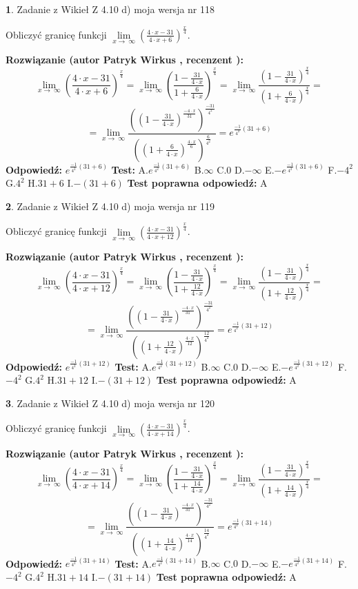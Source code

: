 \documentclass[12pt, a4paper]{article}
\theoremstyle{definition} %
\newtheorem{zad}{}
\newcommand{\zadStart}[1]{\begin{zad}#1\newline}
\newcommand{\zadStop}{\end{zad}}
\newcommand{\rozwStart}[2]{\noindent \textbf{Rozwiązanie (autor #1 , recenzent #2): }\newline}
\newcommand{\rozwStop}{\newline}
\newcommand{\odpStart}{\noindent \textbf{Odpowiedź:}\newline}
\newcommand{\odpStop}{\newline}
\newcommand{\testStart}{\noindent \textbf{Test:}\newline}
\newcommand{\testStop}{\newline}
\newcommand{\kluczStart}{\noindent \textbf{Test poprawna odpowiedź:}\newline}
\newcommand{\kluczStop}{\newline}
\begin{document}
\zadStart{Zadanie z Wikieł Z 4.10 d) moja wersja nr 118}


Obliczyć granicę funkcji  $\lim\limits_{x\to\ \infty}(\frac{4\cdot x-31}{4\cdot x+6})^{\frac{x}{4}}$.
\zadStop
\rozwStart{Patryk Wirkus}{}
$$\lim\limits_{x\to\ \infty}(\frac{4\cdot x-31}{4\cdot x+6})^{\frac{x}{4}} = \lim\limits_{x\to\ \infty}(\frac{1-\frac{31}{4\cdot x}}{1+\frac{6}{4\cdot x}})^{\frac{x}{4}}=\lim\limits_{x\to\ \infty}\frac{(1-\frac{31}{4\cdot x})^{\frac{x}{4}}}{(1+\frac{6}{4\cdot x})^{\frac{x}{4}}}=$$
$$=\lim\limits_{x\to\ \infty}\frac{((1-\frac{31}{4\cdot x})^{\frac{-4\cdot x}{31}})^{\frac{-31}{4^{2}}}}{((1+\frac{6}{4\cdot x})^{\frac{4\cdot x}{6}})^{\frac{6}{4^{2}}}}=e^{\frac{-1}{4^{2}}(31+6)}$$
\rozwStop
\odpStart
$e^{\frac{-1}{4^{2}}(31+6)}$
\odpStop
\testStart
A.$e^{\frac{-1}{4^{2}}(31+6)}$ B.$\infty$ C.$0$ D.$-\infty$ E.$-e^{\frac{-1}{4^{2}}(31+6)}$
F.$-4^{2}$ G.$4^{2}$
H.$31+6$
I.$-(31+6)$
\testStop
\kluczStart
A
\kluczStop



\zadStart{Zadanie z Wikieł Z 4.10 d) moja wersja nr 119}


Obliczyć granicę funkcji  $\lim\limits_{x\to\ \infty}(\frac{4\cdot x-31}{4\cdot x+12})^{\frac{x}{4}}$.
\zadStop
\rozwStart{Patryk Wirkus}{}
$$\lim\limits_{x\to\ \infty}(\frac{4\cdot x-31}{4\cdot x+12})^{\frac{x}{4}} = \lim\limits_{x\to\ \infty}(\frac{1-\frac{31}{4\cdot x}}{1+\frac{12}{4\cdot x}})^{\frac{x}{4}}=\lim\limits_{x\to\ \infty}\frac{(1-\frac{31}{4\cdot x})^{\frac{x}{4}}}{(1+\frac{12}{4\cdot x})^{\frac{x}{4}}}=$$
$$=\lim\limits_{x\to\ \infty}\frac{((1-\frac{31}{4\cdot x})^{\frac{-4\cdot x}{31}})^{\frac{-31}{4^{2}}}}{((1+\frac{12}{4\cdot x})^{\frac{4\cdot x}{12}})^{\frac{12}{4^{2}}}}=e^{\frac{-1}{4^{2}}(31+12)}$$
\rozwStop
\odpStart
$e^{\frac{-1}{4^{2}}(31+12)}$
\odpStop
\testStart
A.$e^{\frac{-1}{4^{2}}(31+12)}$ B.$\infty$ C.$0$ D.$-\infty$ E.$-e^{\frac{-1}{4^{2}}(31+12)}$
F.$-4^{2}$ G.$4^{2}$
H.$31+12$
I.$-(31+12)$
\testStop
\kluczStart
A
\kluczStop



\zadStart{Zadanie z Wikieł Z 4.10 d) moja wersja nr 120}


Obliczyć granicę funkcji  $\lim\limits_{x\to\ \infty}(\frac{4\cdot x-31}{4\cdot x+14})^{\frac{x}{4}}$.
\zadStop
\rozwStart{Patryk Wirkus}{}
$$\lim\limits_{x\to\ \infty}(\frac{4\cdot x-31}{4\cdot x+14})^{\frac{x}{4}} = \lim\limits_{x\to\ \infty}(\frac{1-\frac{31}{4\cdot x}}{1+\frac{14}{4\cdot x}})^{\frac{x}{4}}=\lim\limits_{x\to\ \infty}\frac{(1-\frac{31}{4\cdot x})^{\frac{x}{4}}}{(1+\frac{14}{4\cdot x})^{\frac{x}{4}}}=$$
$$=\lim\limits_{x\to\ \infty}\frac{((1-\frac{31}{4\cdot x})^{\frac{-4\cdot x}{31}})^{\frac{-31}{4^{2}}}}{((1+\frac{14}{4\cdot x})^{\frac{4\cdot x}{14}})^{\frac{14}{4^{2}}}}=e^{\frac{-1}{4^{2}}(31+14)}$$
\rozwStop
\odpStart
$e^{\frac{-1}{4^{2}}(31+14)}$
\odpStop
\testStart
A.$e^{\frac{-1}{4^{2}}(31+14)}$ B.$\infty$ C.$0$ D.$-\infty$ E.$-e^{\frac{-1}{4^{2}}(31+14)}$
F.$-4^{2}$ G.$4^{2}$
H.$31+14$
I.$-(31+14)$
\testStop
\kluczStart
A
\kluczStop
\end{document}
